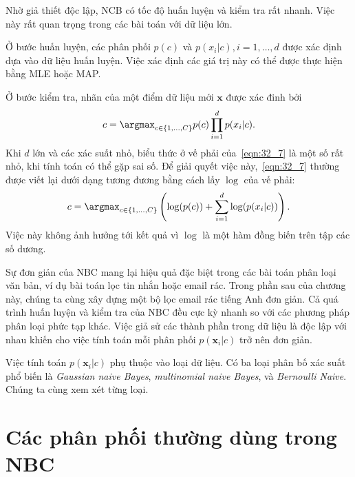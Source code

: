 Nhờ giả thiết độc lập, NCB có tốc độ huấn luyện và
kiểm tra rất nhanh. Việc này rất quan trọng trong các bài toán với dữ liệu lớn.
 
Ở bước huấn luyện, các phân phối $p(c)$ và $p(x_i | c), i = 1, \dots, d$ được xác định dựa vào dữ liệu huấn luyện. Việc xác định các giá trị này có thể được thực hiện bằng MLE hoặc MAP. 
 
Ở bước kiểm tra, nhãn của một điểm dữ liệu mới $\mathbf{x}$ được xác đinh bởi
\begin{equation} 
\label{eqn:32_7}
c = \argmax_{c \in \{1, \dots, C\}} p(c) \prod_{i=1}^d p(x_i | c).
\end{equation} 
Khi $d$ lớn và các xác suất nhỏ, biểu thức ở vế phải của~\eqref{eqn:32_7} là một
số rất nhỏ, khi tính toán có thể gặp sai số. Để giải quyết việc
này,~\eqref{eqn:32_7} thường được viết lại dưới dạng tương đương bằng cách lấy
$\log$ của vế phải:
\begin{equation} 
\label{eqn:32_7_1}
c = \argmax_{c \in \{1, \dots, C\}} \left(\log(p(c)) + \sum_{i=1}^d \log(p(x_i
| c))\right).
\end{equation} 
Việc này không ảnh hưởng tới kết quả vì $\log$ là một hàm đồng biến trên tập các số dương.  
 
Sự đơn giản của NBC mang lại hiệu quả đặc biệt trong các bài toán phân loại văn
bản, ví dụ bài toán lọc tin nhắn hoặc email rác. Trong phần sau của
chương này, chúng ta cùng xây dựng một bộ lọc email rác tiếng Anh đơn giản.
Cả quá trình huấn luyện và kiểm tra của NBC đều cực kỳ nhanh so với các phương
pháp phân loại phức tạp khác. Việc giả sử các thành phần trong dữ liệu là độc
lập với nhau khiến cho việc tính toán mỗi phân phối $p(\mathbf{x}_i|c)$ trở nên đơn giản.
 
 
Việc tính toán $p(\mathbf{x}_i | c) $ phụ thuộc vào loại dữ liệu. Có ba loại
phân bố xác suất phổ biến là \textit{Gaussian naive Bayes},
\textit{multinomial naive Bayes}, và \textit{Bernoulli Naive}. Chúng ta cùng xem xét  từng loại.
 
 
 
 
 
\section{Các phân phối thường dùng trong NBC}
 
 
